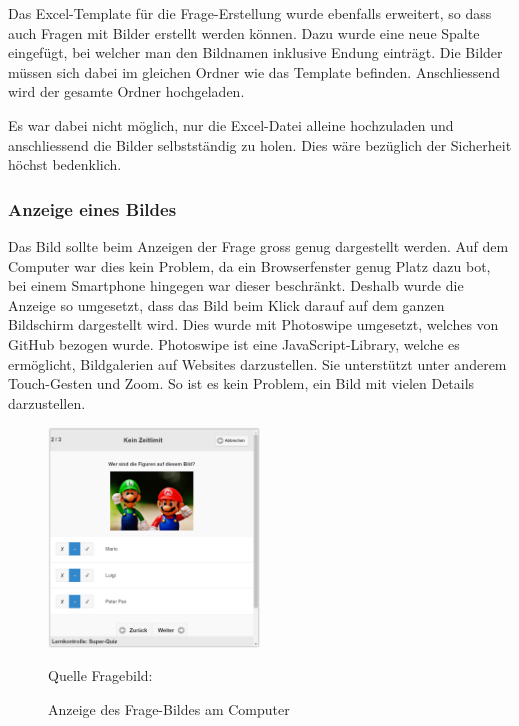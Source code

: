 Das Excel-Template für die Frage-Erstellung wurde ebenfalls erweitert, so dass auch Fragen mit Bilder erstellt werden können. Dazu wurde eine neue Spalte eingefügt, bei welcher man den Bildnamen inklusive Endung einträgt. Die Bilder müssen sich dabei im gleichen Ordner wie das Template befinden. Anschliessend wird der gesamte Ordner hochgeladen.

Es war dabei nicht möglich, nur die Excel-Datei alleine hochzuladen und anschliessend die Bilder selbstständig zu holen. Dies wäre bezüglich der Sicherheit höchst bedenklich.


\subsubsection{Anzeige eines Bildes}
Das Bild sollte beim Anzeigen der Frage gross genug dargestellt werden. Auf dem Computer war dies kein Problem, da ein Browserfenster genug Platz dazu bot, bei einem Smartphone hingegen war dieser beschränkt. Deshalb wurde die Anzeige so umgesetzt, dass das Bild beim Klick darauf auf dem ganzen Bildschirm dargestellt wird. Dies wurde mit Photoswipe \cite{photoswipe} umgesetzt, welches von GitHub \cite{github_photoswipe} bezogen wurde. Photoswipe ist eine JavaScript-Library, welche es ermöglicht, Bildgalerien auf Websites darzustellen. Sie unterstützt unter anderem Touch-Gesten und Zoom. So ist es kein Problem, ein Bild mit vielen Details darzustellen.

\begin{figure}
	\centering
	\includegraphics[width=0.5\textwidth]{Images/Frage-Bild_Anzeige_PC.PNG}
	\caption{Anzeige des Frage-Bildes am Computer}
	Quelle Fragebild: \cite{_bild_pixabay_mario_}
\end{figure}

